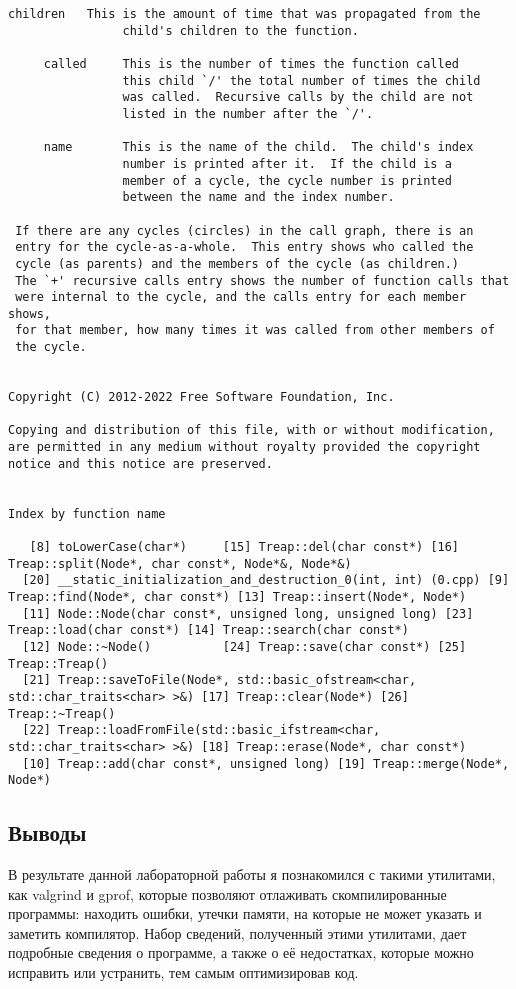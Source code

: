 \documentclass[12pt]{article}
\begin{document}
\begin{lstlisting}[breaklines]
     children   This is the amount of time that was propagated from the
                child's children to the function.

     called     This is the number of times the function called
                this child `/' the total number of times the child
                was called.  Recursive calls by the child are not
                listed in the number after the `/'.

     name       This is the name of the child.  The child's index
                number is printed after it.  If the child is a
                member of a cycle, the cycle number is printed
                between the name and the index number.

 If there are any cycles (circles) in the call graph, there is an
 entry for the cycle-as-a-whole.  This entry shows who called the
 cycle (as parents) and the members of the cycle (as children.)
 The `+' recursive calls entry shows the number of function calls that
 were internal to the cycle, and the calls entry for each member shows,
 for that member, how many times it was called from other members of
 the cycle.


Copyright (C) 2012-2022 Free Software Foundation, Inc.

Copying and distribution of this file, with or without modification,
are permitted in any medium without royalty provided the copyright
notice and this notice are preserved.


Index by function name

   [8] toLowerCase(char*)     [15] Treap::del(char const*) [16] Treap::split(Node*, char const*, Node*&, Node*&)
  [20] __static_initialization_and_destruction_0(int, int) (0.cpp) [9] Treap::find(Node*, char const*) [13] Treap::insert(Node*, Node*)
  [11] Node::Node(char const*, unsigned long, unsigned long) [23] Treap::load(char const*) [14] Treap::search(char const*)
  [12] Node::~Node()          [24] Treap::save(char const*) [25] Treap::Treap()
  [21] Treap::saveToFile(Node*, std::basic_ofstream<char, std::char_traits<char> >&) [17] Treap::clear(Node*) [26] Treap::~Treap()
  [22] Treap::loadFromFile(std::basic_ifstream<char, std::char_traits<char> >&) [18] Treap::erase(Node*, char const*)
  [10] Treap::add(char const*, unsigned long) [19] Treap::merge(Node*, Node*)
\end{lstlisting}



\newpage
\subsection*{Выводы}


В результате данной лабораторной работы я познакомился с такими утилитами, как
valgrind и gprof, которые позволяют отлаживать скомпилированные программы: находить ошибки, утечки
памяти, на которые не может указать и заметить компилятор. Набор сведений, полученный этими утилитами, дает подробные сведения о программе, а также о её недостатках, которые можно исправить или устранить,
тем самым оптимизировав код.
\end{document}
